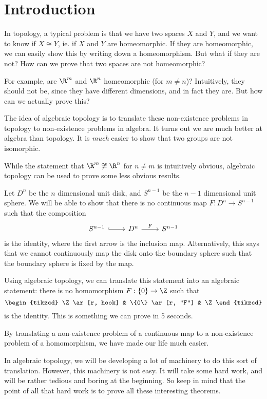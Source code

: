 \documentclass[a4paper]{article}
\begin{document}
\tableofcontents

\setcounter{section}{-1}
\section{Introduction}
In topology, a typical problem is that we have two spaces $X$ and $Y$, and we want to know if $X\cong Y$, ie. if $X$ and $Y$ are homeomorphic. If they are homeomorphic, we can easily show this by writing down a homeomorphism. But what if they are not? How can we prove that two spaces are not homeomorphic?

For example, are $\R^m$ and $\R^n$ homeomorphic (for $m\not= n$)? Intuitively, they should not be, since they have different dimensions, and in fact they are. But how can we actually prove this?

The idea of algebraic topology is to translate these non-existence problems in topology to non-existence problems in algebra. It turns out we are much better at algebra than topology. It is \emph{much} easier to show that two groups are not isomorphic.

While the statement that $\R^m \not\cong \R^n$ for $n \not= m$ is intuitively obvious, algebraic topology can be used to prove some less obvious results.

Let $D^n$ be the $n$ dimensional unit disk, and $S^{n - 1}$ be the $n-1$ dimensional unit sphere. We will be able to show that there is no continuous map $F: D^n \to S^{n - 1}$ such that the composition
\[
  \begin{tikzcd}
    S^{n - 1} \ar[r, hook] & D^n \ar[r, "F"] & S^{n - 1}
  \end{tikzcd}
\]
is the identity, where the first arrow is the inclusion map. Alternatively, this says that we cannot continuously map the disk onto the boundary sphere such that the boundary sphere is fixed by the map.

Using algebraic topology, we can translate this statement into an algebraic statement: there is no homomorphism $F: \{0\} \to \Z$ such that
\[
  \begin{tikzcd}
    \Z \ar[r, hook] & \{0\} \ar[r, "F"] & \Z
  \end{tikzcd}
\]
is the identity. This is something we can prove in 5 seconds.

By translating a non-existence problem of a continuous map to a non-existence problem of a homomorphism, we have made our life much easier.

In algebraic topology, we will be developing a lot of machinery to do this sort of translation. However, this machinery is not easy. It will take some hard work, and will be rather tedious and boring at the beginning. So keep in mind that the point of all that hard work is to prove all these interesting theorems.
\end{document}
